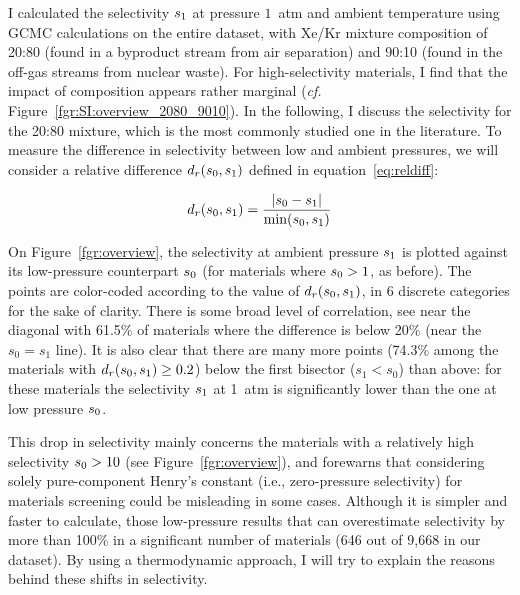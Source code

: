 \documentclass[main.tex]{subfiles}
\begin{document}
I calculated the selectivity $s_{\text{1}}$ at pressure $1$~atm and ambient temperature using GCMC calculations on the entire dataset, with Xe/Kr mixture composition of 20:80 (found in a byproduct stream from air separation\autocite{kerry2007industrial}) and 90:10 (found in the off-gas streams from nuclear waste\autocite{auerbach2003handbook}). For high-selectivity materials, I find that the impact of composition appears rather marginal (\emph{cf.} Figure~\ref{fgr:SI:overview_2080_9010}). In the following, I discuss the selectivity for the 20:80 mixture, which is the most commonly studied one in the literature. To measure the difference in selectivity between low and ambient pressures, we will consider a relative difference $d_r(s_{\text{0}},s_{\text{1}})$ defined in equation~\ref{eq:reldiff}:

\begin{equation}\label{eq:reldiff}
    d_r(s_{\text{0}},s_{\text{1}}) = \dfrac{\lvert s_{\text{0}} - s_{\text{1}} \rvert}{\min(s_{\text{0}},s_{\text{1}})}
\end{equation}

On Figure~\ref{fgr:overview}, the selectivity at ambient pressure $s_{\text{1}}$ is plotted against its low-pressure counterpart $s_{\text{0}}$ (for materials where $s_{\text{0}} > 1$, as before). The points are color-coded according to the value of $d_r(s_{\text{0}},s_{\text{1}})$, in 6 discrete categories for the sake of clarity. There is some broad level of correlation, see near the diagonal with {61.5\%} of materials where the difference is below {20\%} (near the $s_0 = s_1$ line). It is also clear that there are many more points ({74.3\%} among the materials with $d_r(s_{\text{0}},s_{\text{1}})\ge 0.2$) below the first bisector ($s_1 < s_0$) than above: for these materials the selectivity $s_{\text{1}}$ at 1~atm is significantly lower than the one at low pressure $s_{\text{0}}$.

This drop in selectivity mainly concerns the materials with a relatively high selectivity $s_{\text{0}} > 10$ (see Figure~\ref{fgr:overview}), and forewarns that considering solely pure-component Henry's constant (i.e., zero-pressure selectivity) for materials screening could be misleading in some cases. Although it is simpler and faster to calculate, those low-pressure results that can overestimate selectivity by more than {100\%} in a significant number of materials (646 out of 9,668 in our dataset). 
By using a thermodynamic approach, I will try to explain the reasons behind these shifts in selectivity.
\end{document}
